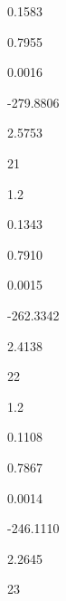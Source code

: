 \documentclass[a4paper,portrait,12pt]{article}
\begin{document}
0.1583





0.7955





0.0016





-279.8806





2.5753





21





1.2





0.1343





0.7910





0.0015





-262.3342





2.4138





22





1.2





0.1108





0.7867





0.0014





-246.1110





2.2645





23
\end{document}
